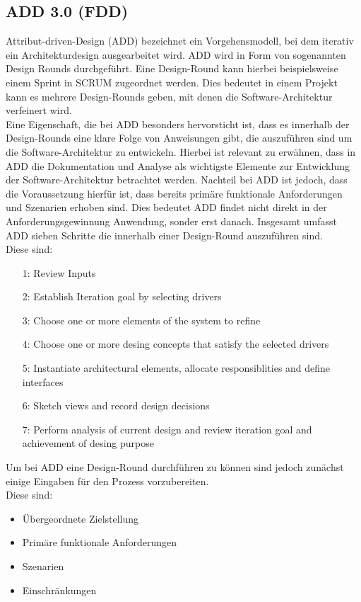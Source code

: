 \subsection{ADD 3.0 (FDD)}
Attribut-driven-Design (ADD) bezeichnet ein Vorgehensmodell, bei dem iterativ ein Architekturdesign ausgearbeitet wird. ADD wird in Form von sogenannten Design Rounds durchgeführt. Eine Design-Round kann hierbei beispielsweise einem Sprint in SCRUM zugeordnet werden. Dies bedeutet in einem Projekt kann es mehrere Design-Rounds geben, mit denen die Software-Architektur verfeinert wird. \\
Eine Eigenschaft, die bei ADD besonders hervorsticht ist, dass es innerhalb der Design-Rounds eine klare Folge von Anweisungen gibt, die auszuführen sind um die Software-Architektur zu entwickeln. Hierbei ist relevant zu erwähnen, dass in ADD die Dokumentation und Analyse als wichtigste Elemente zur Entwicklung der Software-Architektur betrachtet werden. Nachteil bei ADD ist jedoch, dass die Voraussetzung hierfür ist, dass bereits primäre funktionale Anforderungen und Szenarien erhoben sind. Dies bedeutet ADD findet nicht direkt in der Anforderungsgewinnung Anwendung, sonder erst danach. Insgesamt umfasst ADD sieben Schritte die innerhalb einer Design-Round auszuführen sind.\\
Diese sind:
\begin{itemize}
\item[1:] Review Inputs
\item[2:] Establish Iteration goal by selecting drivers
\item[3:] Choose one or more elements of the system to refine
\item[4:] Choose one or more desing concepts that satisfy the selected drivers
\item[5:] Instantiate architectural elements, allocate responsiblities and define interfaces
\item[6:] Sketch views and record design decisions
\item[7:] Perform analysis of current design and review iteration goal and achievement of desing purpose
\end{itemize}
Um bei ADD eine Design-Round durchführen zu können sind jedoch zunächst einige Eingaben für den Prozess vorzubereiten.\\
Diese sind:
\begin{itemize}
\item Übergeordnete Zielstellung
\item Primäre funktionale Anforderungen
\item Szenarien
\item Einschränkungen
\end{itemize}
